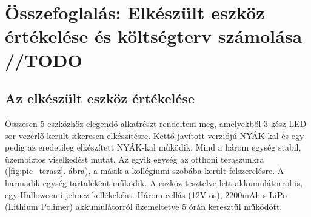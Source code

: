 \documentclass[../main.tex]{subfiles}
\begin{document}
\section{Összefoglalás: Elkészült eszköz értékelése és költségterv számolása //TODO}
    \subsection{Az elkészült eszköz értékelése}
        Összesen 5 eszközhöz elegendő alkatrészt rendeltem meg, amelyekből 3 kész LED sor vezérlő került sikeresen elkészítésre. Kettő javított verziójú NYÁK-kal és egy pedig az eredetileg elkészített NYÁK-kal működik. Mind a három egység stabil, üzembiztos viselkedést mutat. Az egyik egység az otthoni teraszunkra (\ref{fig:pic_terasz}. ábra), a másik a kollégiumi szobába került felszerelésre. A harmadik egység tartaléként működik. A eszköz tesztelve lett akkumulátorrol is, egy Halloween-i jelmez kellékeként. Három cellás (12V-os), 2200mAh-s LiPo (Lithium Polimer) akkumulátorról üzemeltetve 5 órán keresztül működött. 
    
\end{document}
